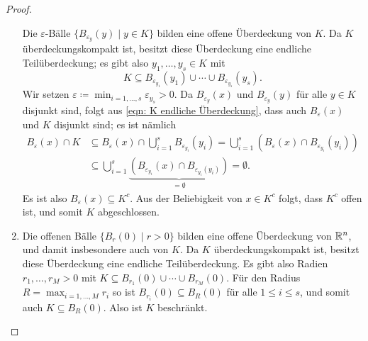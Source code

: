 \documentclass[a4paper,10pt]{article}
\begin{document}
\begin{proof}
\begin{enumerate}
   Die $\varepsilon$-Bälle $\{B_{\varepsilon_y}(y) \mid y \in K\}$ bilden eine offene Überdeckung von $K$. Da $K$ überdeckungskompakt ist, besitzt diese Überdeckung eine endliche Teilüberdeckung; es gibt also $y_1, \dotsc, y_s \in K$ mit
   \begin{equation}\label{eqn: K endliche Überdeckung}
    K \subseteq B_{\varepsilon_{y_1}}(y_1) \cup \dotsb \cup B_{\varepsilon_{y_s}}(y_s).
   \end{equation}
   Wir setzen $\varepsilon \coloneqq \min_{i=1,\dotsc,s} \varepsilon_{y_s} > 0$. Da $B_{\varepsilon_y}(x)$ und $B_{\varepsilon_y}(y)$ für alle $y \in K$ disjunkt sind, folgt aus \eqref{eqn: K endliche Überdeckung}, dass auch $B_\varepsilon(x)$ und $K$ disjunkt sind; es ist nämlich
   \begin{align*}
    B_\varepsilon(x) \cap K
    &\subseteq B_\varepsilon(x) \cap \bigcup_{i=1}^s B_{\varepsilon_{y_i}}(y_i)
    = \bigcup_{i=1}^s (B_\varepsilon(x) \cap B_{\varepsilon_{y_i}}(y_i)) \\
    &\subseteq \bigcup_{i=1}^s \underbrace{(B_{\varepsilon_{y_i}}(x) \cap B_{\varepsilon_{y_i}(y_i)})}_{= \emptyset}
    = \emptyset.
   \end{align*}
   Es ist also $B_\varepsilon(x) \subseteq K^c$. Aus der Beliebigkeit von $x \in K^c$ folgt, dass $K^c$ offen ist, und somit $K$ abgeschlossen.
  \item
   Die offenen Bälle $\{B_r(0) \mid r > 0\}$ bilden eine offene Überdeckung von $\mathbb{R}^n$, und damit insbesondere auch von $K$. Da $K$ überdeckungskompakt ist, besitzt diese Überdeckung eine endliche Teilüberdeckung. Es gibt also Radien $r_1, \dotsc, r_M > 0$ mit $K \subseteq B_{r_1}(0) \cup \dotsb \cup B_{r_M}(0)$. Für den Radius $R = \max_{i=1,\dotsc,M} r_i$ so ist $B_{r_i}(0) \subseteq B_R(0)$ für alle $1 \leq i \leq s$, und somit auch $K \subseteq B_R(0)$. Also ist $K$ beschränkt.
  \qedhere
 \end{enumerate}
\end{proof}
\end{document}
